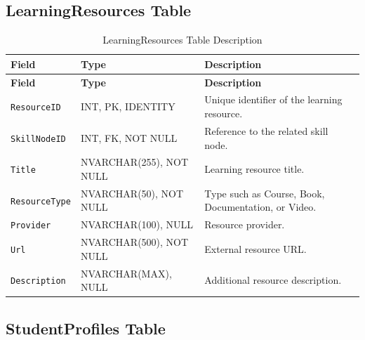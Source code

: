 \subsection{LearningResources Table}

\begin{longtable}{|>{\raggedright\arraybackslash}m{2.9cm}|>{\raggedright\arraybackslash}m{3.45cm}|>{\raggedright\arraybackslash}m{4.95cm}|}
\caption{LearningResources Table Description}
\label{tab:learning_resources_table_description}
\\
\hline
\textbf{Field} & \textbf{Type} & \textbf{Description} \\
\hline
\endfirsthead
\hline
\textbf{Field} & \textbf{Type} & \textbf{Description} \\
\hline
\endhead
\texttt{ResourceID} & INT, PK, IDENTITY & Unique identifier of the learning resource. \\
\hline
\texttt{SkillNodeID} & INT, FK, NOT NULL & Reference to the related skill node. \\
\hline
\texttt{Title} & NVARCHAR(255), NOT NULL & Learning resource title. \\
\hline
\texttt{ResourceType} & NVARCHAR(50), NOT NULL & Type such as Course, Book, Documentation, or Video. \\
\hline
\texttt{Provider} & NVARCHAR(100), NULL & Resource provider. \\
\hline
\texttt{Url} & NVARCHAR(500), NOT NULL & External resource URL. \\
\hline
\texttt{Description} & NVARCHAR(MAX), NULL & Additional resource description. \\
\hline
\end{longtable}

\subsection{StudentProfiles Table}

